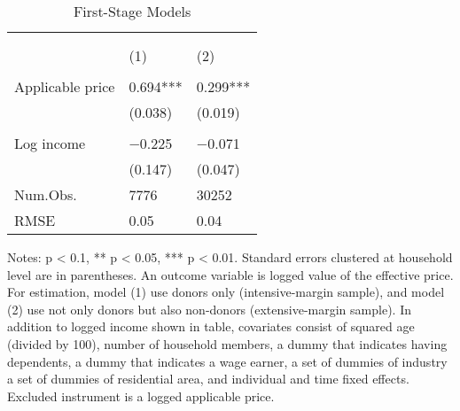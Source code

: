 \begin{table}

\caption{First-Stage Models\label{tab:main-stage1}}
\centering
\fontsize{8}{10}\selectfont
\begin{threeparttable}
\begin{tabular}[t]{l>{\centering\arraybackslash}p{18.75em}>{\centering\arraybackslash}p{18.75em}}
\toprule
\multicolumn{1}{c}{ } & \multicolumn{2}{c}{Effective price} \\
\cmidrule(l{3pt}r{3pt}){2-3}
\multicolumn{1}{c}{ } & \multicolumn{1}{c}{Donors (Intensive-margin)} & \multicolumn{1}{c}{Donors and Non-donors (Extensive-margin)} \\
\cmidrule(l{3pt}r{3pt}){2-2} \cmidrule(l{3pt}r{3pt}){3-3}
  & (1) & (2)\\
\midrule
\addlinespace[0.3em]
\multicolumn{3}{l}{\textit{Excluded instruments}}\\
\hspace{1em}Applicable price & \num{0.694}*** & \num{0.299}***\\
\hspace{1em} & (\num{0.038}) & (\num{0.019})\\
\addlinespace[0.3em]
\multicolumn{3}{l}{\textit{Covariates}}\\
\hspace{1em}Log income & \num{-0.225} & \num{-0.071}\\
\hspace{1em} & (\num{0.147}) & (\num{0.047})\\
\midrule
Num.Obs. & \num{7776} & \num{30252}\\
RMSE & \num{0.05} & \num{0.04}\\
\bottomrule
\end{tabular}
\begin{tablenotes}
\item Notes: p < 0.1, ** p < 0.05, *** p < 0.01. Standard errors clustered at household level are in parentheses. An outcome variable is logged value of the effective price. For estimation, model (1) use donors only (intensive-margin sample), and model (2) use not only donors but also non-donors (extensive-margin sample). In addition to logged income shown in table, covariates consist of squared age (divided by 100), number of household members, a dummy that indicates having dependents, a dummy that indicates a wage earner, a set of dummies of industry a set of dummies of residential area, and individual and time fixed effects. Excluded instrument is a logged applicable price.
\end{tablenotes}
\end{threeparttable}
\end{table}
